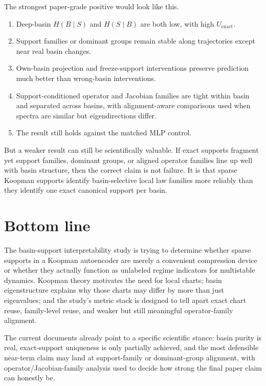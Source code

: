 \documentclass[11pt]{article}
\begin{document}
The strongest paper-grade positive would look like this.
\begin{enumerate}[leftmargin=1.5em]
    \item Deep-basin $H(B \mid S)$ and $H(S \mid B)$ are both low, with high
    $U_{\text{exact}}$.
    \item Support families or dominant groups remain stable along trajectories
    except near real basin changes.
    \item Own-basin projection and freeze-support interventions preserve
    prediction much better than wrong-basin interventions.
    \item Support-conditioned operator and Jacobian families are tight within
    basin and separated across basins, with alignment-aware comparisons used
    when spectra are similar but eigendirections differ.
    \item The result still holds against the matched MLP control.
\end{enumerate}

But a weaker result can still be scientifically valuable. If exact supports
fragment yet support families, dominant groups, or aligned operator families
line up well with basin structure, then the correct claim is not failure. It is
that sparse Koopman supports identify basin-selective local law families more
reliably than they identify one exact canonical support per basin.

\section{Bottom line}

The basin-support interpretability study is trying to determine whether sparse
supports in a Koopman autoencoder are merely a convenient compression device or
whether they actually function as unlabeled regime indicators for multistable
dynamics. Koopman theory motivates the need for local charts; basin
eigenstructure explains why those charts may differ by more than just
eigenvalues; and the study's metric stack is designed to tell apart exact chart
reuse, family-level reuse, and weaker but still meaningful operator-family
alignment.

The current documents already point to a specific scientific stance: basin
purity is real, exact-support uniqueness is only partially achieved, and the
most defensible near-term claim may land at support-family or dominant-group
alignment, with operator/Jacobian-family analysis used to decide how strong the
final paper claim can honestly be.
\end{document}
